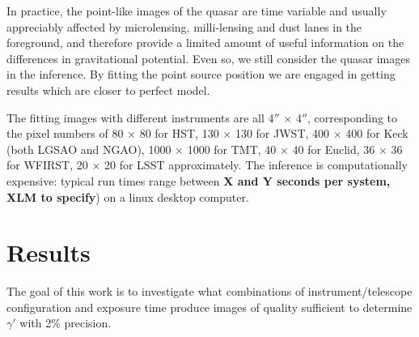 \documentclass[a4paper,11pt]{article}
\begin{document}
In practice, the point-like images of the quasar are time variable and 
usually appreciably affected by microlensing, milli-lensing and 
dust lanes in the foreground, and therefore provide a limited amount of useful
information on the differences in gravitational potential. Even so, 
we still consider the  quasar images in the inference.
By fitting the point source position we are engaged in 
getting results which are closer to perfect model.

The fitting images with different instruments are all 4$''$ $\times$ 4$''$,
corresponding to the pixel numbers of 80 $\times$ 80 for HST,
130 $\times$ 130 for JWST, 400 $\times$ 400 for Keck (both LGSAO and
NGAO), 1000 $\times$ 1000 for TMT, 40 $\times$ 40 for Euclid,
36 $\times$ 36 for WFIRST, 20 $\times$ 20 for LSST approximately.
The inference is computationally expensive: typical run times range
between \textbf{X and Y seconds per system, XLM to specify}) on a
linux desktop computer.

\section{Results}

The goal of this work is to investigate what combinations of
instrument/telescope configuration and exposure time produce images of
quality sufficient to determine $\gamma'$ with 2\% precision. 
\end{document}
